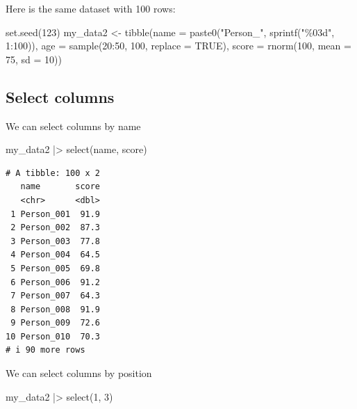\documentclass[
  letterpaper,
  8pt,
  a4paper]{book}
\newenvironment{Shaded}{\begin{snugshade}}{\end{snugshade}}
\newcommand{\AttributeTok}[1]{\textcolor[rgb]{0.40,0.45,0.13}{#1}}
\newcommand{\ConstantTok}[1]{\textcolor[rgb]{0.56,0.35,0.01}{#1}}
\newcommand{\DecValTok}[1]{\textcolor[rgb]{0.68,0.00,0.00}{#1}}
\newcommand{\FunctionTok}[1]{\textcolor[rgb]{0.28,0.35,0.67}{#1}}
\newcommand{\NormalTok}[1]{\textcolor[rgb]{0.00,0.23,0.31}{#1}}
\newcommand{\OtherTok}[1]{\textcolor[rgb]{0.00,0.23,0.31}{#1}}
\newcommand{\SpecialCharTok}[1]{\textcolor[rgb]{0.37,0.37,0.37}{#1}}
\newcommand{\StringTok}[1]{\textcolor[rgb]{0.13,0.47,0.30}{#1}}
\begin{document}
Here is the same dataset with 100 rows:

\begin{Shaded}
\begin{Highlighting}[]
\FunctionTok{set.seed}\NormalTok{(}\DecValTok{123}\NormalTok{)}
\NormalTok{my\_data2 }\OtherTok{\textless{}{-}} \FunctionTok{tibble}\NormalTok{(}\AttributeTok{name =} \FunctionTok{paste0}\NormalTok{(}\StringTok{"Person\_"}\NormalTok{, }\FunctionTok{sprintf}\NormalTok{(}\StringTok{"\%03d"}\NormalTok{, }\DecValTok{1}\SpecialCharTok{:}\DecValTok{100}\NormalTok{)),}
  \AttributeTok{age =} \FunctionTok{sample}\NormalTok{(}\DecValTok{20}\SpecialCharTok{:}\DecValTok{50}\NormalTok{, }\DecValTok{100}\NormalTok{, }\AttributeTok{replace =} \ConstantTok{TRUE}\NormalTok{),}
  \AttributeTok{score =} \FunctionTok{rnorm}\NormalTok{(}\DecValTok{100}\NormalTok{, }\AttributeTok{mean =} \DecValTok{75}\NormalTok{, }\AttributeTok{sd =} \DecValTok{10}\NormalTok{))}
\end{Highlighting}
\end{Shaded}

\subsection*{Select columns}\label{select-columns}

We can select columns by name

\begin{Shaded}
\begin{Highlighting}[]
\NormalTok{my\_data2 }\SpecialCharTok{|\textgreater{}} 
  \FunctionTok{select}\NormalTok{(name, score)}
\end{Highlighting}
\end{Shaded}

\begin{verbatim}
# A tibble: 100 x 2
   name       score
   <chr>      <dbl>
 1 Person_001  91.9
 2 Person_002  87.3
 3 Person_003  77.8
 4 Person_004  64.5
 5 Person_005  69.8
 6 Person_006  91.2
 7 Person_007  64.3
 8 Person_008  91.9
 9 Person_009  72.6
10 Person_010  70.3
# i 90 more rows
\end{verbatim}

We can select columns by position

\begin{Shaded}
\begin{Highlighting}[]
\NormalTok{my\_data2 }\SpecialCharTok{|\textgreater{}} 
  \FunctionTok{select}\NormalTok{(}\DecValTok{1}\NormalTok{, }\DecValTok{3}\NormalTok{)}
\end{Highlighting}
\end{Shaded}
\end{document}
